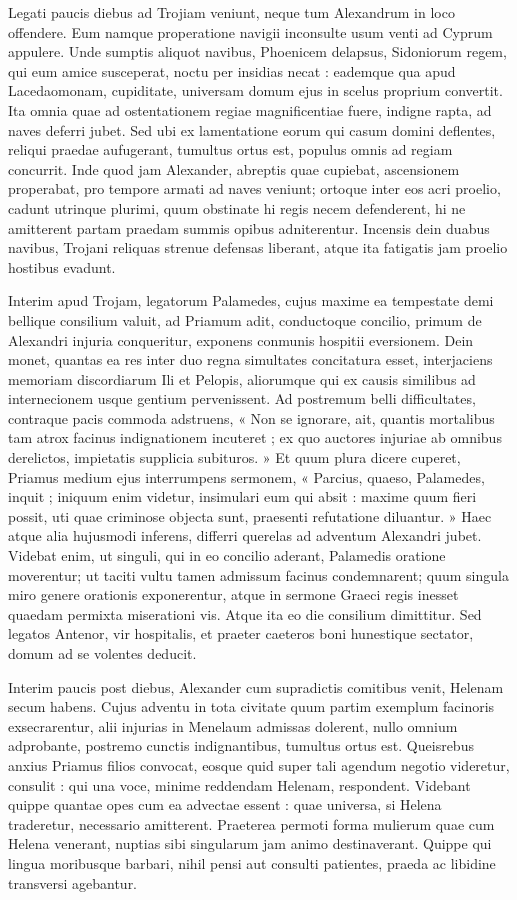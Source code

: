 \documentclass{article}
\begin{document}
\begin{pages}
\begin{Rightside}
Legati paucis diebus ad Trojiam veniunt, neque tum Alexandrum in loco offendere. Eum namque properatione navigii inconsulte usum venti ad Cyprum appulere. Unde sumptis aliquot navibus, Phoenicem delapsus, Sidoniorum regem, qui eum amice susceperat, noctu per insidias necat : eademque qua apud Lacedaomonam, cupiditate, universam domum ejus in scelus proprium convertit. Ita omnia quae ad ostentationem regiae magnificentiae fuere, indigne rapta, ad naves deferri jubet. Sed ubi ex lamentatione eorum qui casum domini deflentes, reliqui praedae aufugerant, tumultus ortus est, populus omnis ad regiam concurrit. Inde quod jam Alexander, abreptis quae cupiebat, ascensionem properabat, pro tempore armati ad naves veniunt; ortoque inter eos acri proelio, cadunt utrinque plurimi, quum obstinate hi regis necem defenderent, hi ne amitterent partam praedam summis opibus adniterentur. Incensis dein duabus navibus, Trojani reliquas strenue defensas liberant, atque ita fatigatis jam proelio hostibus evadunt.

Interim apud Trojam, legatorum Palamedes, cujus maxime ea tempestate demi bellique consilium valuit, ad Priamum adit, conductoque concilio, primum de Alexandri injuria conqueritur, exponens conmunis hospitii eversionem. Dein monet, quantas ea res inter duo regna simultates concitatura esset, interjaciens memoriam discordiarum Ili et Pelopis, aliorumque qui ex causis similibus ad internecionem usque gentium pervenissent. Ad postremum belli difficultates, contraque pacis commoda adstruens, « Non se ignorare, ait, quantis mortalibus tam atrox facinus indignationem incuteret ; ex quo auctores injuriae ab omnibus derelictos, impietatis supplicia subituros. » Et quum plura dicere cuperet, Priamus medium ejus interrumpens sermonem, « Parcius, quaeso, Palamedes, inquit ; iniquum enim videtur, insimulari eum qui absit : maxime quum fieri possit, uti quae criminose objecta sunt, praesenti refutatione diluantur. » Haec atque alia hujusmodi inferens, differri querelas ad adventum Alexandri jubet. Videbat enim, ut singuli, qui in eo concilio aderant, Palamedis oratione moverentur; ut taciti vultu tamen admissum facinus condemnarent; quum singula miro genere orationis exponerentur, atque in sermone Graeci regis inesset quaedam permixta miserationi vis. Atque ita eo die consilium dimittitur. Sed legatos Antenor, vir hospitalis, et praeter caeteros boni hunestique sectator, domum ad se volentes deducit.

Interim paucis post diebus, Alexander cum supradictis comitibus venit, Helenam secum habens. Cujus adventu in tota civitate quum partim exemplum facinoris exsecrarentur, alii injurias in Menelaum admissas dolerent, nullo omnium adprobante, postremo cunctis indignantibus, tumultus ortus est. Queisrebus anxius Priamus filios convocat, eosque quid super tali agendum negotio videretur, consulit : qui una voce, minime reddendam Helenam, respondent. Videbant quippe quantae opes cum ea advectae essent : quae universa, si Helena traderetur, necessario amitterent. Praeterea permoti forma mulierum quae cum Helena venerant, nuptias sibi singularum jam animo destinaverant. Quippe qui lingua moribusque barbari, nihil pensi aut consulti patientes, praeda ac libidine transversi agebantur.


\end{Rightside}
\end{pages}
\end{document}
